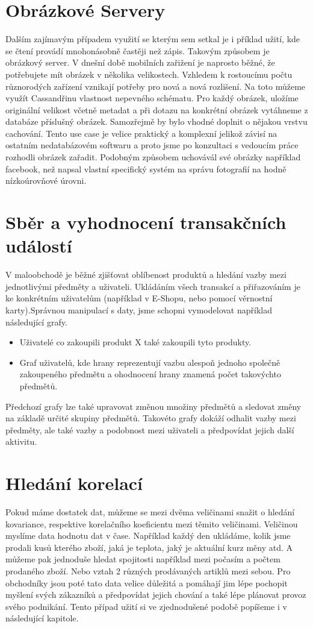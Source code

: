 \documentclass[thesis=M,czech]{FITthesis}[2012/06/26]
\begin{document}
\section{Obrázkové Servery}
Dalším zajímavým případem využití se kterým sem setkal je i příklad užití, kde se čtení provádí mnohonásobně častěji než zápis. Takovým způsobem je obrázkový server. V dnešní době mobilních zařižení je naprosto běžné, že potřebujete mít obrázek v několika velikostech. Vzhledem k rostoucímu počtu různorodých zařízení vznikají potřeby pro nová a nová rozlišení. Na toto můžeme využít Cassandřinu vlastnost nepevného schématu. Pro každý obrázek, uložíme originální velikost včetně metadat a při dotazu na konkrétní obrázek vytáhneme z databáze příslušný obrázek. Samozřejmě by bylo vhodné doplnit o nějakou vrstvu cachování. Tento use case je velice praktický a komplexní jelikož závisí na ostatním nedatabázovém softwaru a proto jsme po konzultaci s vedoucím práce rozhodli obrázek zařadit. Podobným způsobem uchovávál své obrázky například facebook, než napsal vlastní specifický systém na správu fotografií na hodně nízkoúrovňové úrovni. 

\section{Sběr a vyhodnocení transakčních událostí}
V maloobchodě je běžné zjišťovat oblíbenost produktů a hledání vazby mezi jednotlivými předměty a uživateli. Ukládáním všech transakcí a přiřazováním je ke konkrétním uživatelům (například v E-Shopu, nebo pomocí věrnostní karty).Správnou manipulací s daty, jsme schopni vymodelovat například následující grafy.

\begin{itemize}
\item Uživatelé co zakoupili produkt X také zakoupili tyto produkty.
\item Graf uživatelů, kde hrany reprezentují vazbu alespoň jednoho společně zakoupeného předmětu a ohodnocení hrany znamená počet takovýchto předmětů. 
\end{itemize} 
Předchozí grafy lze také upravovat změnou množiny předmětů a sledovat změny na základě určité skupiny předmětů. Takovéto grafy dokáží odhalit vazby mezi předměty, ale také vazby a podobnost mezi uživateli a předpovídat jejich další aktivitu. 
\newpage
\section{Hledání korelací}
Pokud máme dostatek dat, můžeme se mezi dvěma veličinami snažit o hledání kovariance, respektive korelačního koeficientu mezi těmito veličinami. Veličinou myslíme data hodnotu dat v čase. Například každý den ukládáme, kolik jsme prodali kusů kterého zboží, jaká je teplota, jaký je aktuální kurz měny atd. A můžeme pak jednoduše hledat spojitosti například mezi počasím a počtem prodaného zboží. Nebo vztah 2 různých prodávaných artiklů mezi sebou. Pro obchodníky jsou poté tato data velice důležitá a pomáhají jim lépe pochopit myšlení svých zákazníků a předpovídat jejich chování a také lépe plánovat provoz svého podnikání. Tento případ užití si ve zjednodušené podobě popíšeme i v následující kapitole. 
\end{document}
